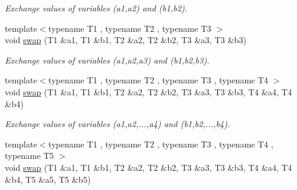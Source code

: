 \begin{DoxyCompactItemize}
\begin{DoxyCompactList}\small\item\em Exchange values of variables ({\ttfamily a1},{\ttfamily a2}) and ({\ttfamily b1},{\ttfamily b2}). \item\end{DoxyCompactList}\item 
\hypertarget{namespacecimg__library_1_1cimg_a4954a1551001dc082044597dc9fdcbc3}{
{\footnotesize template$<$typename T1 , typename T2 , typename T3 $>$ }\\void \hyperlink{namespacecimg__library_1_1cimg_a4954a1551001dc082044597dc9fdcbc3}{swap} (T1 \&a1, T1 \&b1, T2 \&a2, T2 \&b2, T3 \&a3, T3 \&b3)}
\label{namespacecimg__library_1_1cimg_a4954a1551001dc082044597dc9fdcbc3}

\begin{DoxyCompactList}\small\item\em Exchange values of variables ({\ttfamily a1},{\ttfamily a2},{\ttfamily a3}) and ({\ttfamily b1},{\ttfamily b2},{\ttfamily b3}). \item\end{DoxyCompactList}\item 
\hypertarget{namespacecimg__library_1_1cimg_a1e3369e3c4141ff696432f35ec075379}{
{\footnotesize template$<$typename T1 , typename T2 , typename T3 , typename T4 $>$ }\\void \hyperlink{namespacecimg__library_1_1cimg_a1e3369e3c4141ff696432f35ec075379}{swap} (T1 \&a1, T1 \&b1, T2 \&a2, T2 \&b2, T3 \&a3, T3 \&b3, T4 \&a4, T4 \&b4)}
\label{namespacecimg__library_1_1cimg_a1e3369e3c4141ff696432f35ec075379}

\begin{DoxyCompactList}\small\item\em Exchange values of variables ({\ttfamily a1},{\ttfamily a2},...,{\ttfamily a4}) and ({\ttfamily b1},{\ttfamily b2},...,{\ttfamily b4}). \item\end{DoxyCompactList}\item 
\hypertarget{namespacecimg__library_1_1cimg_a635ae52148ed9edf9aeda5e81bc58884}{
{\footnotesize template$<$typename T1 , typename T2 , typename T3 , typename T4 , typename T5 $>$ }\\void \hyperlink{namespacecimg__library_1_1cimg_a635ae52148ed9edf9aeda5e81bc58884}{swap} (T1 \&a1, T1 \&b1, T2 \&a2, T2 \&b2, T3 \&a3, T3 \&b3, T4 \&a4, T4 \&b4, T5 \&a5, T5 \&b5)}
\label{namespacecimg__library_1_1cimg_a635ae52148ed9edf9aeda5e81bc58884}


\end{DoxyCompactItemize}
